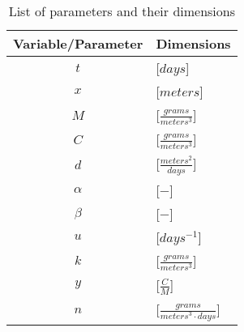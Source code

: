   \begin{table}[!hbt]
    \centering
    \begin{tabular}{|c | l |}
      \hline 
      Variable/Parameter & Dimensions \\
      \hline 
      $t$ & [$days$] \\
      $x$ & [$meters$] \\
      $ M $ & [$\frac{grams}{meters^3}$] \\
      $ C $ & [$\frac{grams}{meters^3}$] \\
      $ d $ & [$\frac{meters^2}{days}$] \\
      $ \alpha $ & [$-$]  \\
      $ \beta  $ & [$-$]  \\
      $ u $ & [$days^{-1} $] \\
      $ k $ & [$\frac{grams}{meters^3}$] \\
      $ y $ & [$\frac{C}{M}$]  \\
      $ n $ & [$\frac{grams}{meters^3 \cdot days}$] \\
      \hline
    \end{tabular}
    \caption{List of parameters and their dimensions}
        \label{tab:varDimensions}
  \end{table}


